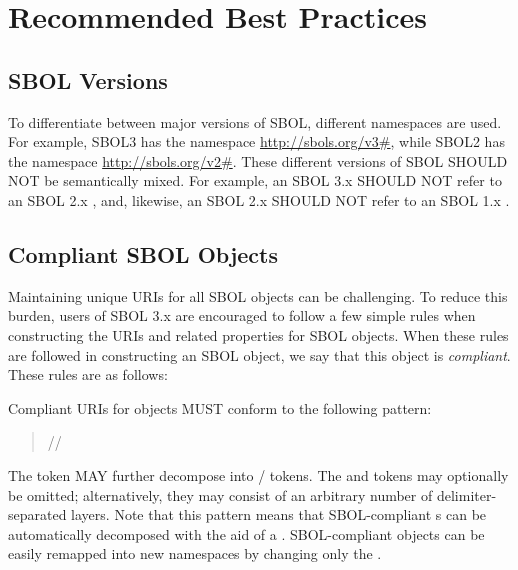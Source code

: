 \section{Recommended Best Practices}
\label{sec:bestpractices}
\subsection{SBOL Versions}

To differentiate between major versions of SBOL, different namespaces are used.  For example, SBOL3 has the namespace \url{http://sbols.org/v3#}, while SBOL2 has the namespace \url{http://sbols.org/v2#}.  These different versions of SBOL SHOULD NOT be semantically mixed. For example, an SBOL 3.x  SHOULD NOT refer to an SBOL 2.x , and, likewise, an SBOL 2.x  SHOULD NOT refer to an SBOL 1.x .

\subsection{Compliant SBOL Objects}
\label{sec:compliant}

Maintaining unique URIs for all SBOL objects can be challenging.  To reduce this burden, users of SBOL 3.x are encouraged to follow a few simple rules when constructing the URIs and related properties for SBOL objects.  When these rules are followed in constructing an SBOL object, we say that this object is \emph{compliant}. These rules are as follows:

Compliant URIs for  objects MUST conform to the following pattern:
\begin{quotation} 
//
\end{quotation}

The  token MAY further decompose into / tokens. The  and  tokens may optionally be omitted; alternatively, they may consist of an arbitrary number of delimiter-separated layers. Note that this pattern means that SBOL-compliant s can be automatically decomposed with the aid of a . SBOL-compliant objects can be easily remapped into new namespaces by changing only the .

